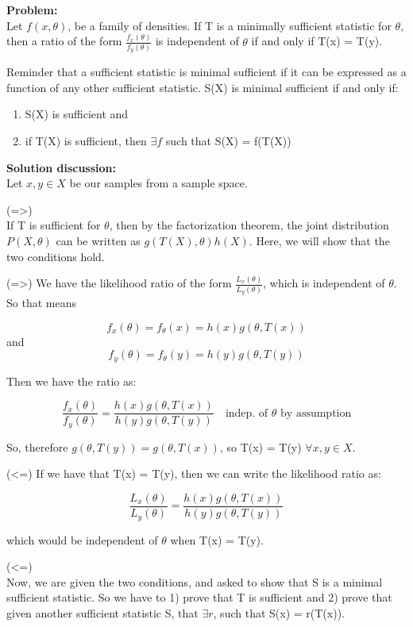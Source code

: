      \textbf{Problem:}\\
        Let $f(x, \theta)$, be a family of densities. If T is a minimally sufficient statistic for $\theta$, then a ratio of the form $\frac{f_x(\theta)}{f_y(\theta)}$ is independent of $\theta$ if and only if T(x) = T(y).

        Reminder that a sufficient statistic is minimal sufficient if it can be expressed as a function of any other sufficient statistic. S(X) is minimal sufficient if and only if:

        \begin{enumerate}
          \item S(X) is sufficient and
          \item if T(X) is sufficient, then $\exists f$ such that S(X) = f(T(X))
        \end{enumerate}

      \textbf{Solution discussion:}\\

        Let $x, y \in X$ be our samples from a sample space.

        (=>)\\
          If T is sufficient for $\theta$, then by the factorization theorem, the joint distribution $P(X, \theta)$ can be written as $g(T(X), \theta)h(X)$. Here, we will show that the two conditions hold.

          (=>) We have the likelihood ratio of the form $\frac{L_x(\theta)}{L_y(\theta)}$, which is independent of $\theta$. So that means 

          $$f_x(\theta) = f_{\theta}(x) = h(x) g(\theta, T(x))$$ and
          $$f_y(\theta) = f_{\theta}(y) = h(y) g(\theta, T(y))$$

          Then we have the ratio as:

          $$\frac{f_x(\theta)}{f_y(\theta)} = \frac{h(x) g(\theta, T(x))}{h(y) g(\theta, T(y))} \quad \text{indep. of $\theta$ by assumption}$$

          So, therefore $g(\theta, T(y)) = g(\theta, T(x))$, so T(x) = T(y) $\forall x,y \in X$.

          (<=) If we have that T(x) = T(y), then we can write the likelihood ratio as:

          $$\frac{L_x(\theta)}{L_y(\theta)} = \frac{h(x) g(\theta, T(x))}{h(y) g(\theta, T(y))}$$

          which would be independent of $\theta$ when T(x) = T(y).

        (<=)\\
          Now, we are given the two conditions, and asked to show that S is a minimal sufficient statistic. So we have to 1) prove that T is sufficient and 2) prove that given another sufficient statistic S, that $\exists r$, such that S(x) = r(T(x)).

